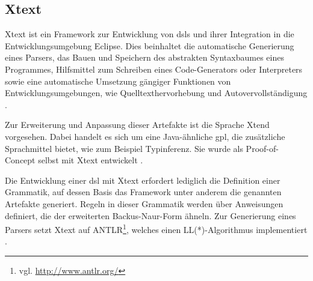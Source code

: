 \subsection{Xtext}
    \label{section:solutionDetailsDslXtext}
    Xtext ist ein Framework zur Entwicklung von \glspl{dsl} und ihrer Integration
    in die Entwicklungsumgebung Eclipse.
    Dies beinhaltet die automatische Generierung eines Parsers,
    das Bauen und Speichern des abstrakten Syntaxbaumes eines Programmes,
    Hilfsmittel zum Schreiben eines Code-Generators oder Interpreters
    sowie eine automatische Umsetzung gängiger Funktionen von
    Entwicklungsumgebungen, wie Quelltexthervorhebung und Autovervollständigung
    \cite[Kapitel 1]{bettini:xtext}.

    Zur Erweiterung und Anpassung dieser Artefakte ist die Sprache Xtend vorgesehen.
    Dabei handelt es sich um eine Java-ähnliche \gls{gpl},
    die zusätzliche Sprachmittel bietet, wie zum Beispiel Typinferenz.
    Sie wurde als Proof-of-Concept selbst mit Xtext entwickelt
    \cite[Kapitel 3]{bettini:xtext}.

    Die Entwicklung einer \gls{dsl} mit Xtext erfordert lediglich die Definition
    einer Grammatik, auf dessen Basis das Framework unter anderem die genannten 
    Artefakte generiert.
    Regeln in dieser Grammatik werden über Anweisungen definiert,
    die der erweiterten Backus-Naur-Form ähneln.
    Zur Generierung eines Parsers setzt Xtext auf
    ANTLR\footnote{vgl. \url{http://www.antlr.org/}},
    welches einen LL(*)-Algorithmus implementiert
    \cite{xtext:documentation,parr:antlr}.
